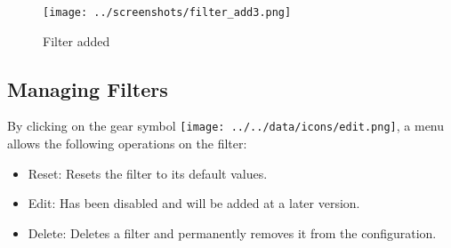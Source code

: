 \begin{figure}[H]
  \center
    \texttt{[image: ../screenshots/filter\_add3.png]}
  \caption{Filter added}
  \label{fig:filter_add3}
\end{figure}

\subsection{Managing Filters}
\label{sec:filter_management}

By clicking on the gear symbol \texttt{[image: ../../data/icons/edit.png]}, a menu allows the following operations on the filter:

\begin{itemize}  
\item Reset: Resets the filter to its default values.
\item Edit: Has been disabled and will be added at a later version.
\item Delete: Deletes a filter and permanently removes it from the configuration.
\end{itemize}
 
